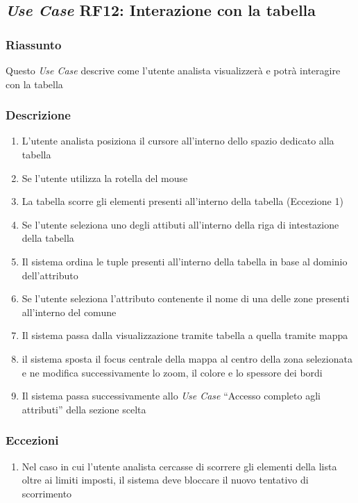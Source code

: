     \subsection{\textit{Use Case} RF12: Interazione con la tabella}
        \subsubsection{Riassunto}
            Questo \textit{Use Case} descrive come l'utente analista visualizzerà e potrà interagire con la tabella
        \subsubsection{Descrizione}
            \begin{enumerate}
                \item L'utente analista posiziona il cursore all'interno dello spazio dedicato alla tabella
                \item Se l'utente utilizza la rotella del mouse
                \item La tabella scorre gli elementi presenti all'interno della tabella (Eccezione 1)
                \item Se l'utente seleziona uno degli attibuti all'interno della riga di intestazione della tabella
                \item Il sistema ordina le tuple presenti all'interno della tabella in base al dominio dell'attributo
                \item Se l'utente seleziona l'attributo contenente il nome di una delle zone presenti all'interno del comune
                \item Il sistema passa dalla visualizzazione tramite tabella a quella tramite mappa
                \item il sistema sposta il focus centrale della mappa al centro della zona selezionata e ne modifica successivamente lo zoom, il colore e lo spessore dei bordi
                \item Il sistema passa successivamente allo \textit{Use Case} ``Accesso completo agli attributi'' della sezione scelta
            \end{enumerate}
        \subsubsection{Eccezioni}
            \begin{enumerate}
                \item Nel caso in cui l'utente analista cercasse di scorrere gli elementi della lista oltre ai limiti imposti, il sistema deve bloccare il nuovo tentativo di scorrimento
            \end{enumerate}
